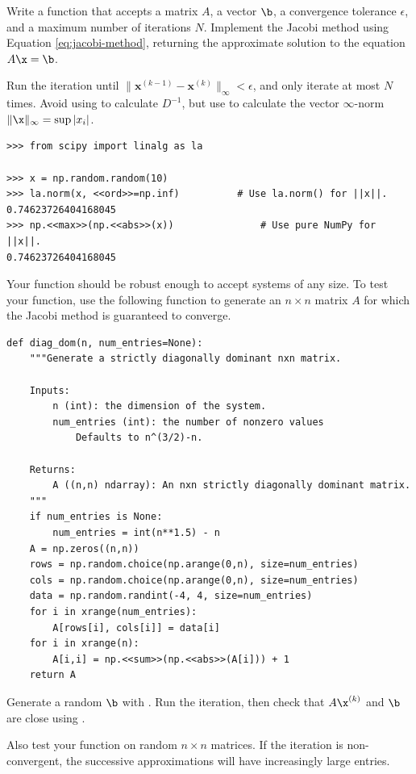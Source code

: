 \begin{problem} %
Write a function that accepts a matrix $A$, a vector $\b$, a convergence tolerance $\epsilon$, and a maximum number of iterations $N$.
Implement the Jacobi method using Equation \ref{eq:jacobi-method}, returning the approximate solution to the equation $A\x = \b$.

Run the iteration until $\|\mathbf{x}^{(k-1)} - \mathbf{x}^{(k)}\|_{\infty} < \epsilon$, and only iterate at most $N$ times.
Avoid using  to calculate $D^{-1}$, but use  to calculate the vector $\infty$-norm $\|\x\|_\infty = \sup{|x_i|}$.

\begin{lstlisting}
>>> from scipy import linalg as la

>>> x = np.random.random(10)
>>> la.norm(x, <<ord>>=np.inf)          # Use la.norm() for ||x||.
0.74623726404168045
>>> np.<<max>>(np.<<abs>>(x))               # Use pure NumPy for ||x||.
0.74623726404168045
\end{lstlisting}

Your function should be robust enough to accept systems of any size.
To test your function, use the following function to generate an $n\times n$ matrix $A$ for which the Jacobi method is guaranteed to converge.

\begin{lstlisting}
def diag_dom(n, num_entries=None):
    """Generate a strictly diagonally dominant nxn matrix.

    Inputs:
        n (int): the dimension of the system.
        num_entries (int): the number of nonzero values
            Defaults to n^(3/2)-n.

    Returns:
        A ((n,n) ndarray): An nxn strictly diagonally dominant matrix.
    """
    if num_entries is None:
        num_entries = int(n**1.5) - n
    A = np.zeros((n,n))
    rows = np.random.choice(np.arange(0,n), size=num_entries)
    cols = np.random.choice(np.arange(0,n), size=num_entries)
    data = np.random.randint(-4, 4, size=num_entries)
    for i in xrange(num_entries):
        A[rows[i], cols[i]] = data[i]
    for i in xrange(n):
        A[i,i] = np.<<sum>>(np.<<abs>>(A[i])) + 1
    return A
\end{lstlisting}

Generate a random $\b$ with .
Run the iteration, then check that $A\x^{(k)}$ and $\b$ are close using .

Also test your function on random $n \times n$ matrices.
If the iteration is non-convergent, the successive approximations will have increasingly large entries.

\label{prob:jacobi}
\end{problem}

